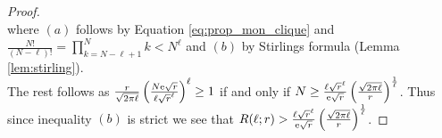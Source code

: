 \begin{proof}
\begin{equation}
	\end{equation}
	where $(a)$ follows by Equation \eqref{eq:prop_mon_clique} and $\frac{N!}{(N - \ell)!} = \prod^N_{k = N - \ell + 1} k < N^{\ell}$ and $(b)$ by Stirlings formula (Lemma \ref{lem:stirling}). \\
	The rest follows as $\frac{r}{\sqrt{2\pi\ell}} \left(\frac{N \textnormal{e} \sqrt{r}}{\ell \sqrt{r}^{\ell}}\right)^{\ell} \geq 1$ if and only if $N \geq \frac{\ell \sqrt{r}^{\ell}}{\textnormal{e} \sqrt{r}} \left(\frac{\sqrt{2\pi\ell}}{r}\right)^{\frac{1}{\ell}}$. Thus since inequality $(b)$ is strict we see that $R(\ell; r) > \frac{\ell \sqrt{r}^{\ell}}{\textnormal{e} \sqrt{r}} \left(\frac{\sqrt{2\pi\ell}}{r}\right)^{\frac{1}{\ell}}$.
\end{proof}

